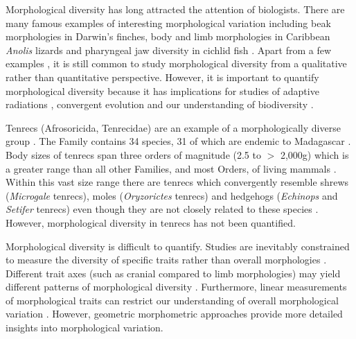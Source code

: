 \documentclass[12pt,a4paper]{article}
\begin{document}
	Morphological diversity has long attracted the attention of biologists. There are many famous examples of interesting morphological variation including beak morphologies in Darwin's finches, body and limb morphologies in Caribbean \textit{Anolis} lizards and pharyngeal jaw diversity in cichlid fish \citep{Gavrilets2009}. %
	Apart from a few examples \citep[e.g.][]{Goswami2011, Ruta2013, Brusatte2008}, it is still common to study morphological diversity from a qualitative rather than quantitative perspective. However, it is important to quantify morphological diversity because it has implications for studies of adaptive radiations \citep{Losos2010}, convergent evolution \citep[e.g.][]{Muschick2012, Harmon2005} and our understanding of biodiversity \citep{Roy1997}.
	


	Tenrecs (Afrosoricida, Tenrecidae) are an example of a morphologically diverse group \citep{Soarimalala2011, Olson2003}. The Family contains 34 species, 31 of which are endemic to Madagascar \citep{Olson2013}. Body sizes of tenrecs span three orders of magnitude (2.5 to $>$ 2,000g) which is a greater range than all other Families, and most Orders, of living mammals \citep{Olson2003}. Within this vast size range there are tenrecs which convergently resemble shrews (\textit{Microgale} tenrecs), moles (\textit{Oryzorictes} tenrecs) and hedgehogs (\textit{Echinops} and \textit{Setifer} tenrecs) \citep{Eisenberg1969} even though they are not closely related to these species \citep{Stanhope1998}. However, morphological diversity in tenrecs has not been quantified.


	Morphological diversity is difficult to quantify. Studies are inevitably constrained to measure the diversity of specific traits rather than overall morphologies \citep{Roy1997}. Different trait axes (such as cranial compared to limb morphologies) may yield different patterns of morphological diversity \citep{Foth2012}.
	Furthermore, linear measurements of morphological traits can restrict our understanding of overall morphological variation \citep{Rohlf1993}. However, geometric morphometric approaches \citep{Rohlf1993, Adams2013} provide more detailed insights into morphological variation.
	 
\end{document}
